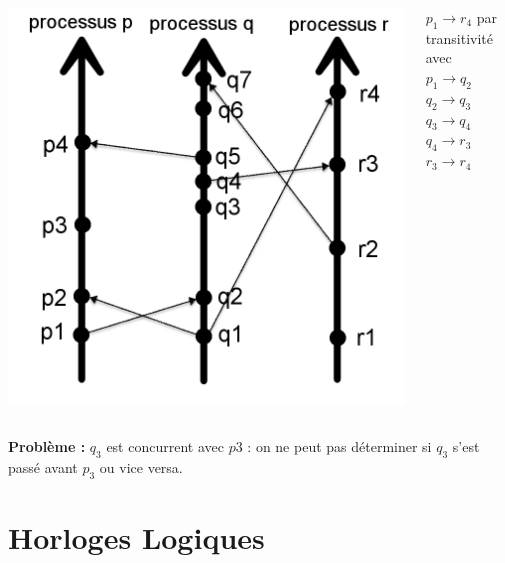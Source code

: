 \documentclass[compress]{beamer}
\begin{document}
\begin{frame}
  \begin{columns}
    \begin{column}{.4\textwidth}
		\includegraphics[scale=0.19]{process2.png}
    \end{column}
	\begin{column}{0.6 \textwidth}
\begin{center}
$p_1 \rightarrow r_4$  par transitivité avec \\
\bigskip
	$p_1 \rightarrow q_2$\\$q_2 \rightarrow q_3$ \\ $q_3 \rightarrow q_4$ \\ $q_4 \rightarrow r_3$ \\ $r_3 \rightarrow r_4$\\
\end{center}
	\end{column}
	\end{columns}
	\bigskip	\textbf{{\color{red}Problème : }}$q_3$ est concurrent avec $p3$ : on ne peut pas déterminer si $q_3$ s'est passé avant $p_3$ ou vice versa.
\end{frame}

\section{Horloges Logiques}
\end{document}
